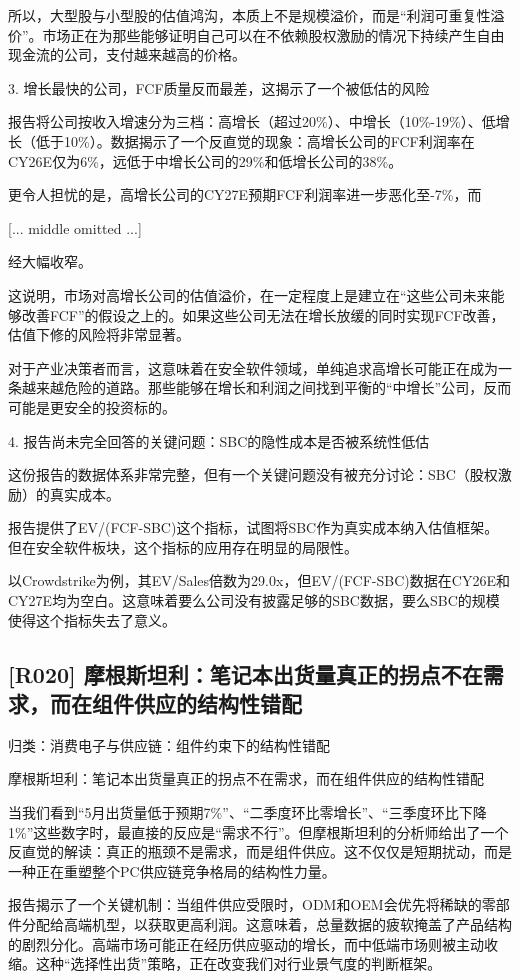 \documentclass[11pt]{ctexart}
\begin{document}
所以，大型股与小型股的估值鸿沟，本质上不是规模溢价，而是“利润可重复性溢价”。市场正在为那些能够证明自己可以在不依赖股权激励的情况下持续产生自由现金流的公司，支付越来越高的价格。

3. 增长最快的公司，FCF质量反而最差，这揭示了一个被低估的风险

报告将公司按收入增速分为三档：高增长（超过20\%）、中增长（10\%-19\%）、低增长（低于10\%）。数据揭示了一个反直觉的现象：高增长公司的FCF利润率在CY26E仅为6\%，远低于中增长公司的29\%和低增长公司的38\%。

更令人担忧的是，高增长公司的CY27E预期FCF利润率进一步恶化至-7\%，而

[... middle omitted ...]

经大幅收窄。

这说明，市场对高增长公司的估值溢价，在一定程度上是建立在“这些公司未来能够改善FCF”的假设之上的。如果这些公司无法在增长放缓的同时实现FCF改善，估值下修的风险将非常显著。

对于产业决策者而言，这意味着在安全软件领域，单纯追求高增长可能正在成为一条越来越危险的道路。那些能够在增长和利润之间找到平衡的“中增长”公司，反而可能是更安全的投资标的。

4. 报告尚未完全回答的关键问题：SBC的隐性成本是否被系统性低估

这份报告的数据体系非常完整，但有一个关键问题没有被充分讨论：SBC（股权激励）的真实成本。

报告提供了EV/(FCF-SBC)这个指标，试图将SBC作为真实成本纳入估值框架。但在安全软件板块，这个指标的应用存在明显的局限性。

以Crowdstrike为例，其EV/Sales倍数为29.0x，但EV/(FCF-SBC)数据在CY26E和CY27E均为空白。这意味着要么公司没有披露足够的SBC数据，要么SBC的规模使得这个指标失去了意义。

\subsection{[R020] 摩根斯坦利：笔记本出货量真正的拐点不在需求，而在组件供应的结构性错配}
{\small\color{refgray}归类：消费电子与供应链：组件约束下的结构性错配}

摩根斯坦利：笔记本出货量真正的拐点不在需求，而在组件供应的结构性错配

当我们看到“5月出货量低于预期7\%”、“二季度环比零增长”、“三季度环比下降1\%”这些数字时，最直接的反应是“需求不行”。但摩根斯坦利的分析师给出了一个反直觉的解读：真正的瓶颈不是需求，而是组件供应。这不仅仅是短期扰动，而是一种正在重塑整个PC供应链竞争格局的结构性力量。

报告揭示了一个关键机制：当组件供应受限时，ODM和OEM会优先将稀缺的零部件分配给高端机型，以获取更高利润。这意味着，总量数据的疲软掩盖了产品结构的剧烈分化。高端市场可能正在经历供应驱动的增长，而中低端市场则被主动收缩。这种“选择性出货”策略，正在改变我们对行业景气度的判断框架。
\end{document}
